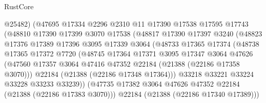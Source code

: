 \begin{lexlean}{RustCore}
\begin{coremodule}
                          @25482)
                        (@47695
                          @17334
                          @2296
                          @2310
                          @11
                          @17390
                          @17538
                          @17595
                          @17743
                          (@48810
                            @17390
                            @17399
                            @3070
                            @17538
                            (@48817
                              @17390
                              @17397
                              @3240
                              (@48823
                                @17376
                                @17389
                                @17396
                                @3095
                                @17339
                                @3064
                                (@48733
                                  @17365
                                  @17374
                                  (@48738
                                    @17365
                                    @17372
                                    @7720
                                    (@48745
                                      @17364
                                      @17371
                                      @3095
                                      @17347
                                      @3064
                                      @47626
                                      (@47560
                                        @17357
                                        @3064
                                        @47416
                                        @47352
                                        @22184
                                        (@21388 (@22186 @17358 @3070)))
                                      @22184
                                      (@21388 (@22186 @17348 @17364)))
                                    @33218
                                    @33221
                                    @33224
                                    @33228
                                    @33233
                                    @33239))
                                (@47735
                                  @17382
                                  @3064
                                  @47626
                                  @47352
                                  @22184
                                  (@21388 (@22186 @17383 @3070)))
                                @22184
                                (@21388 (@22186 @17340 @17389)))

\end{coremodule}
\end{lexlean}
